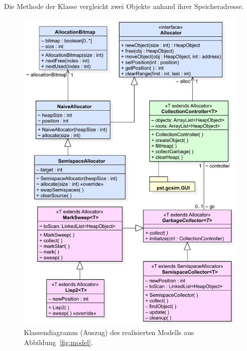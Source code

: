 \begin{listing}[h]
	\inputminted[]{java}{code/AddressComparator.java}
	\caption[Klasse  zum Vergleich von Objekten]{Die Methode  der Klasse  vergleicht zwei Objekte anhand ihrer Speicheradresse.}
	\label{java:comparator}
\end{listing}

\begin{figure}[t!]
	\centering
	\includegraphics[scale=0.6]{img/uml/ch7-klassen.pdf}
	\caption[Klassendiagramm des realisierten Modells (Auszug)]{Klassendiagramm (Auszug) des realisierten Modells aus Abbildung~\ref{fig:model}.}
	\label{fig:implementation}
\end{figure}

